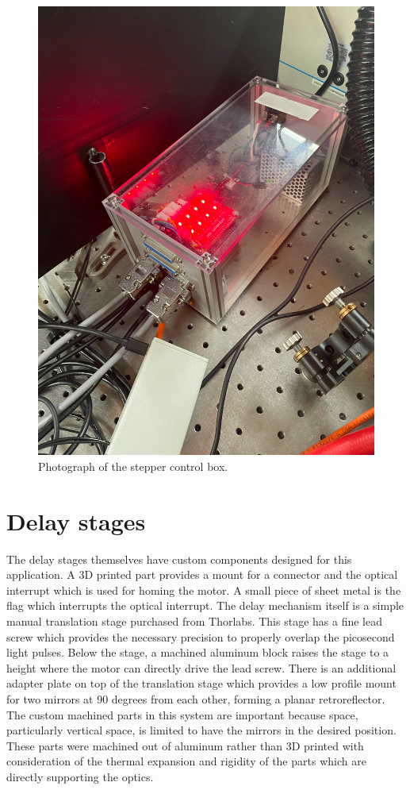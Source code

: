 \begin{figure}
	\includegraphics[width=5in]{opa400/images/opa400_control_box}
\caption[Stepper Control Box]{
Photograph of the stepper control box.
}
\label{opa4:fig:control_box_photo}
\end{figure}


\section{Delay stages}  %

The delay stages themselves have custom components designed for this application.
A 3D printed part provides a mount for a connector and the optical interrupt which is used for homing the motor.
A small piece of sheet metal is the flag which interrupts the optical interrupt.
The delay mechanism itself is a simple manual translation stage purchased from Thorlabs\cite{}.
This stage has a fine lead screw which provides the necessary precision to properly overlap the picosecond light pulses.
Below the stage, a machined aluminum block raises the stage to a height where the motor can directly drive the lead screw.
There is an additional adapter plate on top of the translation stage which provides a low profile mount for two mirrors at 90 degrees from each other, forming a planar retroreflector.
The custom machined parts in this system are important because space, particularly vertical space, is limited to have the mirrors in the desired position.
These parts were machined out of aluminum rather than 3D printed with consideration of the thermal expansion and rigidity of the parts which are directly supporting the optics.

